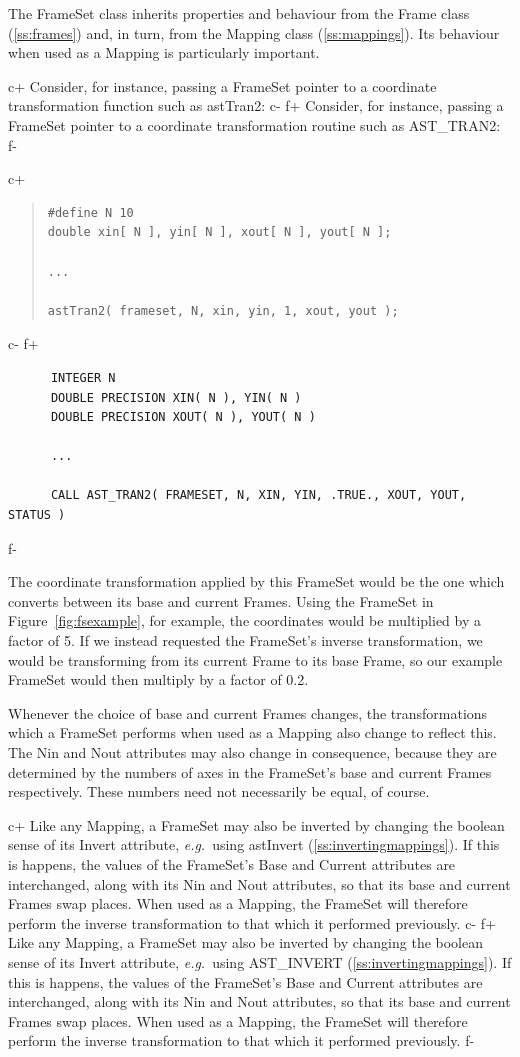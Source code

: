 \documentclass[twoside,11pt]{article}
\newcommand{\secref}[1]{\S\ref{#1}}
\renewcommand{\secref}[1]{\ref{#1}}
\begin{document}
The FrameSet class inherits properties and behaviour from the Frame
class (\secref{ss:frames}) and, in turn, from the Mapping class
(\secref{ss:mappings}). Its behaviour when used as a Mapping is
particularly important.

c+
Consider, for instance, passing a FrameSet pointer to a coordinate
transformation function such as astTran2:
c-
f+
Consider, for instance, passing a FrameSet pointer to a coordinate
transformation routine such as AST\_TRAN2:
f-

c+
\begin{quote}
\small
\begin{verbatim}
#define N 10
double xin[ N ], yin[ N ], xout[ N ], yout[ N ];

...

astTran2( frameset, N, xin, yin, 1, xout, yout );
\end{verbatim}
\normalsize
\end{quote}
c-
f+
\small
\begin{verbatim}
      INTEGER N
      DOUBLE PRECISION XIN( N ), YIN( N )
      DOUBLE PRECISION XOUT( N ), YOUT( N )

      ...

      CALL AST_TRAN2( FRAMESET, N, XIN, YIN, .TRUE., XOUT, YOUT, STATUS )
\end{verbatim}
\normalsize
f-

The coordinate transformation applied by this FrameSet would be the
one which converts between its base and current Frames. Using the
FrameSet in Figure~\ref{fig:fsexample}, for example, the coordinates
would be multiplied by a factor of 5.  If we instead requested the
FrameSet's inverse transformation, we would be transforming from its
current Frame to its base Frame, so our example FrameSet would then
multiply by a factor of 0.2.

Whenever the choice of base and current Frames changes, the
transformations which a FrameSet performs when used as a Mapping also
change to reflect this. The Nin and Nout attributes may also change in
consequence, because they are determined by the numbers of axes in the
FrameSet's base and current Frames respectively. These numbers need
not necessarily be equal, of course.

c+
Like any Mapping, a FrameSet may also be inverted by changing the
boolean sense of its Invert attribute, {\em{e.g.}}\ using astInvert
(\secref{ss:invertingmappings}). If this is happens, the values of the
FrameSet's Base and Current attributes are interchanged, along with
its Nin and Nout attributes, so that its base and current Frames swap
places. When used as a Mapping, the FrameSet will therefore perform
the inverse transformation to that which it performed previously.
c-
f+
Like any Mapping, a FrameSet may also be inverted by changing the
boolean sense of its Invert attribute, {\em{e.g.}}\ using AST\_INVERT
(\secref{ss:invertingmappings}). If this is happens, the values of the
FrameSet's Base and Current attributes are interchanged, along with
its Nin and Nout attributes, so that its base and current Frames swap
places. When used as a Mapping, the FrameSet will therefore perform
the inverse transformation to that which it performed previously.
f-
\end{document}
